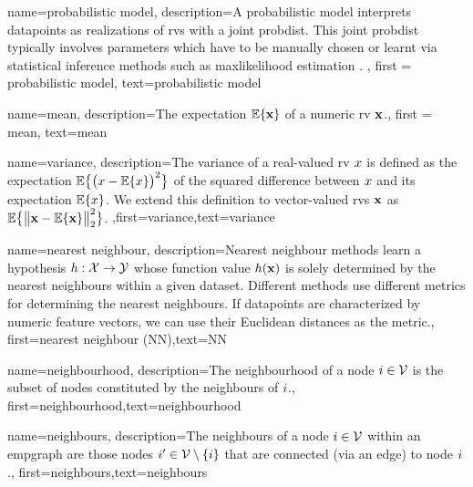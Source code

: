 {
	name=probabilistic model,
	description={A probabilistic model interprets \gls{datapoint}s 
		as \gls{realization}s of \gls{rv}s with a joint \gls{probdist}. This joint \gls{probdist} typically 
		involves parameters which have to be manually chosen or learnt via statistical inference 
		methods such as \gls{maxlikelihood} estimation \cite{LC}. }, 
	first = {probabilistic model}, text={probabilistic model} 
}



{
	name=mean,
	description={The expectation $\mathbb{E} \{ {\bf x} \}$ of a numeric \gls{rv} ${\bf x}$.}, 
		first = {mean}, text={mean} 
}

{
	name={variance},
	description={The variance of a real-valued \gls{rv} $x$ is defined as the expectation 
		$\mathbb{E}\big\{ \big( x - \mathbb{E}\{x \} \big)^{2} \big\}$ of the squared difference between $x$ 
		and its expectation $\mathbb{E}\{x \}$. We extend this definition to vector-valued \gls{rv}s ${\bf x}$ 
		as $\mathbb{E}\big\{ \big\| {\bf x} - \mathbb{E}\{{\bf x} \} \big\|_{2}^{2} \big\}$.} ,first={variance},text={variance} 
}

{
	name={nearest neighbour},
	description={Nearest neighbour methods learn a \gls{hypothesis} 
		$h: \mathcal{X} \rightarrow \mathcal{Y}$ whose function value $h({\bf x})$ 
		is solely determined by the nearest neighbours within a given \gls{dataset}. Different 
		methods use different metrics for determining the nearest neighbours. If \gls{datapoint}s 
		are characterized by numeric \gls{feature} vectors, we can use their Euclidean distances as 
		the metric.},
	first={nearest neighbour (NN)},text={NN} 
}

{
	name={neighbourhood},
	description={The neighbourhood of a node $i \in \mathcal{V}$ is 
	the subset of nodes constituted by the \gls{neighbours} of $i$.},
	first={neighbourhood},text={neighbourhood} 
}


{
	name={neighbours},
	description={The neighbours of a node $i \in \mathcal{V}$ 
	within an \gls{empgraph} are those nodes $i' \in \mathcal{V} \setminus \{ i\}$ that are connected (via an edge) to node $i$.},
	first={neighbours},text={neighbours} 
}

